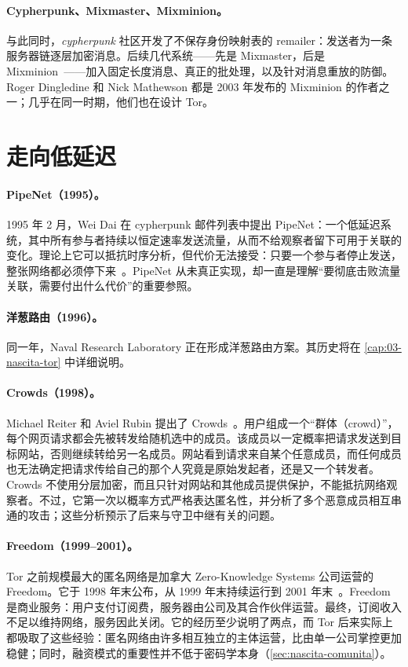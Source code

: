 \paragraph{Cypherpunk、Mixmaster、Mixminion。} 与此同时，\emph{cypherpunk} 社区开发了不保存身份映射表的 remailer：发送者为一条服务器链逐层加密消息。后续几代系统——先是 Mixmaster，后是 Mixminion~\cite{danezis2003mixminion}——加入固定长度消息、真正的批处理，以及针对消息重放的防御。Roger Dingledine 和 Nick Mathewson 都是 2003 年发布的 Mixminion 的作者之一；几乎在同一时期，他们也在设计 Tor。

\section{走向低延迟}\label{sec:radici-bassa}

\paragraph{PipeNet（1995）。} 1995 年 2 月，Wei Dai 在 cypherpunk 邮件列表中提出 PipeNet：一个低延迟系统，其中所有参与者持续以恒定速率发送流量，从而不给观察者留下可用于关联的变化。理论上它可以抵抗时序分析，但代价无法接受：只要一个参与者停止发送，整张网络都必须停下来~\cite{syverson2011peel}。PipeNet 从未真正实现，却一直是理解“要彻底击败流量关联，需要付出什么代价”的重要参照。

\paragraph{洋葱路由（1996）。} 同一年，Naval Research Laboratory 正在形成洋葱路由方案。其历史将在 \cref{cap:03-nascita-tor} 中详细说明。

\paragraph{Crowds（1998）。} Michael Reiter 和 Aviel Rubin 提出了 Crowds~\cite{reiter1998crowds}。用户组成一个\enquote{群体（crowd）}，每个网页请求都会先被转发给随机选中的成员。该成员以一定概率把请求发送到目标网站，否则继续转给另一名成员。网站看到请求来自某个任意成员，而任何成员也无法确定把请求传给自己的那个人究竟是原始发起者，还是又一个转发者。Crowds 不使用分层加密，而且只针对网站和其他成员提供保护，不能抵抗网络观察者。不过，它第一次以概率方式严格表达匿名性，并分析了多个恶意成员相互串通的攻击；这些分析预示了后来与守卫中继有关的问题。

\paragraph{Freedom（1999--2001）。} Tor 之前规模最大的匿名网络是加拿大 Zero-Knowledge Systems 公司运营的 Freedom。它于 1998 年末公布，从 1999 年末持续运行到 2001 年末~\cite{syverson2011peel}。Freedom 是商业服务：用户支付订阅费，服务器由公司及其合作伙伴运营。最终，订阅收入不足以维持网络，服务因此关闭。它的经历至少说明了两点，而 Tor 后来实际上都吸取了这些经验：匿名网络由许多相互独立的主体运营，比由单一公司掌控更加稳健；同时，融资模式的重要性并不低于密码学本身（\cref{sec:nascita-comunita}）。

